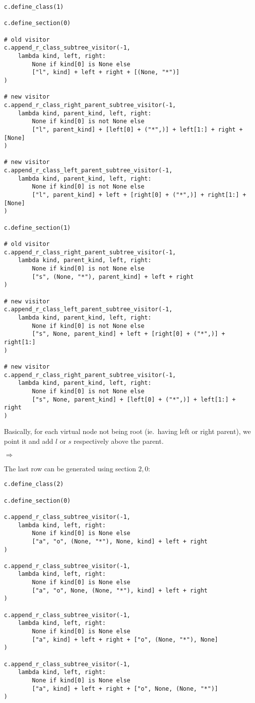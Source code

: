 \documentclass[final]{article}
\theoremstyle{definition}
\theoremstyle{remark}
\newcommand{\includeinlinesvg}[2]{\begin{minipage}{#1\textwidth}\end{minipage}}
\begin{document}
\begin{lstlisting}
c.define_class(1)

c.define_section(0)

# old visitor
c.append_r_class_subtree_visitor(-1,
    lambda kind, left, right:
        None if kind[0] is None else
        ["l", kind] + left + right + [(None, "*")]
)

# new visitor
c.append_r_class_right_parent_subtree_visitor(-1,
    lambda kind, parent_kind, left, right:
        None if kind[0] is not None else
        ["l", parent_kind] + [left[0] + ("*",)] + left[1:] + right + [None]
)

# new visitor
c.append_r_class_left_parent_subtree_visitor(-1,
    lambda kind, parent_kind, left, right:
        None if kind[0] is not None else
        ["l", parent_kind] + left + [right[0] + ("*",)] + right[1:] + [None]
)

c.define_section(1)

# old visitor
c.append_r_class_right_parent_subtree_visitor(-1,
    lambda kind, parent_kind, left, right:
        None if kind[0] is not None else
        ["s", (None, "*"), parent_kind] + left + right
)

# new visitor
c.append_r_class_left_parent_subtree_visitor(-1,
    lambda kind, parent_kind, left, right:
        None if kind[0] is not None else
        ["s", None, parent_kind] + left + [right[0] + ("*",)] + right[1:]
)

# new visitor
c.append_r_class_right_parent_subtree_visitor(-1,
    lambda kind, parent_kind, left, right:
        None if kind[0] is not None else
        ["s", None, parent_kind] + [left[0] + ("*",)] + left[1:] + right
)
\end{lstlisting}

Basically, for each virtual node not being root (ie.\ having left or right parent), we point it and add \(l\) or \(s\) respectively above the parent.

\includeinlinesvg{.32}{trees_111__1_base}%
\(\Rightarrow\)
\includeinlinesvg{.32}{trees_101__0}%
\includeinlinesvg{.32}{trees_112__0}%

The last row can be generated using section \(2, 0\):

\begin{lstlisting}
c.define_class(2)

c.define_section(0)

c.append_r_class_subtree_visitor(-1,
    lambda kind, left, right:
        None if kind[0] is None else
        ["a", "o", (None, "*"), None, kind] + left + right
)

c.append_r_class_subtree_visitor(-1,
    lambda kind, left, right:
        None if kind[0] is None else
        ["a", "o", None, (None, "*"), kind] + left + right
)

c.append_r_class_subtree_visitor(-1,
    lambda kind, left, right:
        None if kind[0] is None else
        ["a", kind] + left + right + ["o", (None, "*"), None]
)

c.append_r_class_subtree_visitor(-1,
    lambda kind, left, right:
        None if kind[0] is None else
        ["a", kind] + left + right + ["o", None, (None, "*")]
)
\end{lstlisting}
\end{document}
